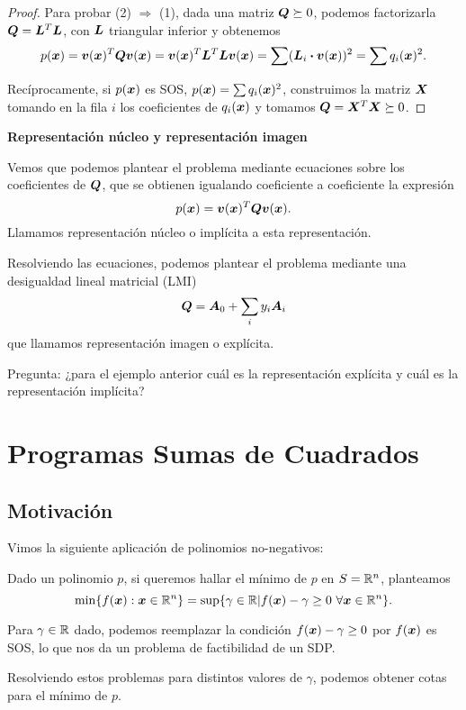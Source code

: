 \begin{proof}

Para probar (2) $\Rightarrow$ (1), dada una matriz $\bm{Q} \succeq 0$, podemos factorizarla $\bm{Q} = \bm{L}^T \bm{L}$, con $\bm{L}$ triangular inferior y obtenemos
$$
p(\bm{x}) = \bm{v}(\bm{x})^T \bm{Q} \bm{v}(\bm{x}) = \bm{v}(\bm{x})^T \bm{L}^T \bm{L} \bm{v}(\bm{x}) = \sum (\bm{L}_i \boldsymbol{\cdot} \bm{v}(\bm{x}))^2 = \sum q_i(\bm{x})^2.
$$

Recíprocamente, si $p(\bm{x})$ es SOS, $p(\bm{x}) = \sum q_i(\bm{x})^2$, construimos la matriz $\bm{X}$ tomando en la fila $i$ los coeficientes de $q_i(\bm{x})$ y tomamos $\bm{Q} = \bm{X}^T \bm{X} \succeq 0$.

\end{proof}

\textbf{Representación núcleo y representación imagen}

Vemos que podemos plantear el problema mediante ecuaciones sobre los coeficientes de $\bm{Q}$, que se obtienen igualando coeficiente a coeficiente la expresión
$$p(\bm{x}) = \bm{v}(\bm{x})^T \bm{Q} \bm{v}(\bm{x}).$$
Llamamos representación núcleo o implícita a esta representación.

Resolviendo las ecuaciones, podemos plantear el problema mediante una desigualdad lineal matricial (LMI)
$$\bm{Q} = \bm{A}_0 + \sum_i y_i \bm{A}_i$$
que llamamos representación imagen o explícita.


Pregunta: ¿para el ejemplo anterior cuál es la representación explícita y cuál es la representación implícita?


\section{Programas Sumas de Cuadrados}

\subsection{Motivación}

Vimos la siguiente aplicación de polinomios no-negativos:

Dado un polinomio $p$, si queremos hallar el mínimo de $p$ en $S = \mathbb{R}^n$, planteamos
\[
\min\{f(\bm{x}) : \bm{x} \in \mathbb{R}^n\} = \sup\{\gamma \in \mathbb{R} | f(\bm{x}) - \gamma \ge 0 \ \forall \bm{x} \in \mathbb{R}^n\}.
\]

Para $\gamma \in \mathbb{R}$ dado, podemos reemplazar la condición $f(\bm{x}) - \gamma \ge 0$ por $f(\bm{x})$ es SOS, lo que nos da un problema de factibilidad de un SDP.

Resolviendo estos problemas para distintos valores de $\gamma$, podemos obtener cotas para el mínimo de $p$.

